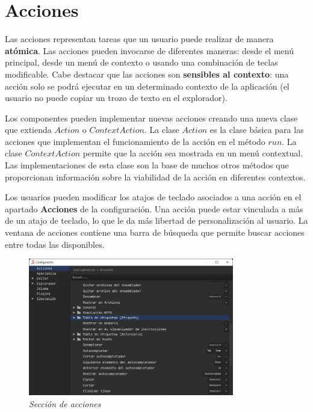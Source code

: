 \section{Acciones}\label{sec:acciones}

Las acciones representan tareas que un usuario puede realizar de manera
\textbf{atómica}.
Las acciones pueden invocarse de diferentes maneras:
desde el menú principal, desde un menú de contexto
o usando una combinación de teclas modificable.
Cabe destacar que las acciones son \textbf{sensibles al contexto}:
una acción solo se podrá ejecutar en un determinado contexto
de la aplicación (el usuario no puede copiar un trozo de texto
en el explorador).

Los componentes pueden implementar nuevas acciones
creando una nueva clase que extienda $Action$ o $ContextAction$.
La clase $Action$ es la clase básica para las acciones que implementan el funcionamiento
de la acción en el método $run$.
La clase $ContextAction$ permite que la acción sea
mostrada en un menú contextual.
Las implementaciones de esta clase son la base de
muchos otros métodos que proporcionan información
sobre la viabilidad de la acción en diferentes contextos.

Los usuarios pueden modificar los atajos de teclado
asociados a una acción en el apartado \textbf{Acciones} de la
configuración.
Una acción puede estar vinculada a más de un atajo de teclado,
lo que le da más libertad de personalización al usuario.
La ventana de acciones contiene una barra de búsqueda que
permite buscar acciones entre todas las disponibles.

\begin{figure}[H]
    \centering
    \includegraphics[width=0.8\textwidth]{images/base/jams-config-actions}
    \caption{\textit{Sección de acciones}}
    \label{fig:jams-configuracion-acciones}
\end{figure}


